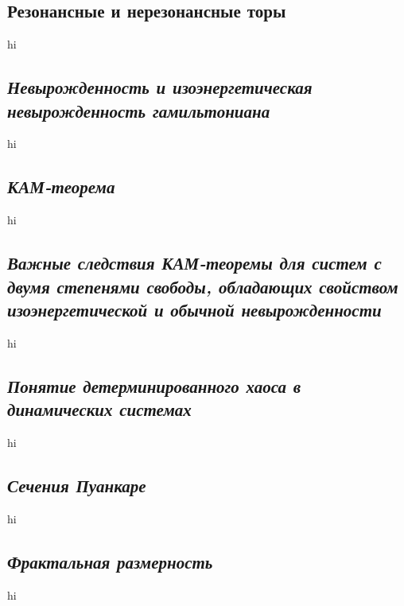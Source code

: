 \documentclass[a4paper,12pt]{article}
\begin{document}
\subsection{Резонансные и нерезонансные торы}
hi
\subsection{\emph{Невырожденность и изоэнергетическая невырожденность
гамильтониана}}
hi
\subsection{\emph{КАМ-теорема}}
hi
\subsection{\emph{Важные следствия КАМ-теоремы для систем с двумя степенями свободы,
обладающих свойством изоэнергетической и обычной невырожденности}}
hi
\subsection{\emph{Понятие детерминированного хаоса в динамических системах}}
hi
\subsection{\emph{Сечения Пуанкаре}}
hi
\subsection{\emph{Фрактальная размерность}}
hi
\end{document}
